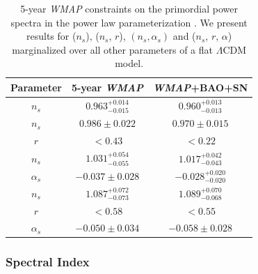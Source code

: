 \documentclass[12pt,letterpaper,rotate]{article}
\begin{document}
{\vspace{0.5cm}
\begin{table}[h!]
\begin{center}
\begin{tabular}{||c|c|c||}
\hline \hline
{\small \bf Parameter} & {\small 5-year {\sl WMAP}} & {\small {\sl WMAP}+BAO+SN} \\
\hline
{\small $n_s$} & {\small $0.963_{-0.015}^{+0.014}$} & {\small $0.960_{-0.013}^{+0.013}$} \\
\hline
{\small $n_s$} & {\small $0.986 \pm 0.022$} & {\small $0.970 \pm 0.015$} \\
 {\small $r$} & {\small $<0.43$} & {\small $<0.22$} \\
\hline
 {\small $n_s$} & {\small $1.031_{-0.055}^{+0.054}$} & {\small $1.017_{-0.043}^{+0.042}$} \\
{\small  $\alpha_s$} & {\small $-0.037 \pm 0.028$} & {\small $-0.028_{-0.020}^{+0.020}$} \\
\hline
{\small $n_s$} & {\small $1.087_{-0.073}^{+0.072}$} & {\small $1.089_{-0.068}^{+0.070}$} \\
 {\small $r$} & {\small $<0.58$} & {\small $<0.55$} \\
{\small $\alpha_s$} & {\small $-0.050 \pm 0.034$} & {\small $-0.058 \pm 0.028$} \\
\hline \hline
\end{tabular}
\caption{ \label{tab:param} 5-year {\sl WMAP} constraints on the primordial power spectra in the power law parameterization \cite{WMAP5}.  We present results for ($n_s$), ($n_s$, $r$), $(n_s, \alpha_s)$ and ($n_s$, $r$, $\alpha$) marginalized over all other parameters of a flat $\Lambda$CDM model.}
\end{center}
\end{table}


\subsubsection{Spectral Index}

}
\end{document}
